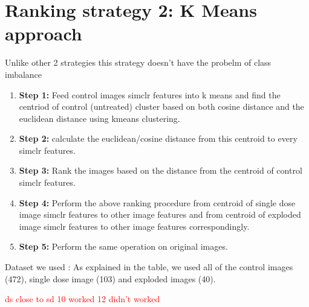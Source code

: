 \section{Ranking strategy 2: K Means approach}

Unlike other 2 strategies this strategy doesn't have the probelm of class imbalance

\begin{enumerate}
  \item \textbf{Step 1:} Feed control images simclr features into k means and find the centriod of control (untreated) cluster based on both cosine distance and the euclidean distance using kmeans clustering. 
 
  
  \item \textbf{Step 2:} calculate the euclidean/cosine distance from this centroid to every simclr features.
  \item \textbf{Step 3:} Rank the images based on the distance from the centroid of control simclr features.
  \item \textbf{Step 4:} Perform the above ranking procedure from centroid of single dose image simclr features to other image features and from centroid of exploded image simclr features to other image features correspondingly.
  
  \item \textbf{Step 5:} Perform the same operation  on original images.
\end{enumerate}


Dataset we used : As explained in the table, we used all of the control images (472),
single dose image (103) and exploded images (40).

\textcolor{red}{ds close to sd 10 worked 12 didn't worked}



